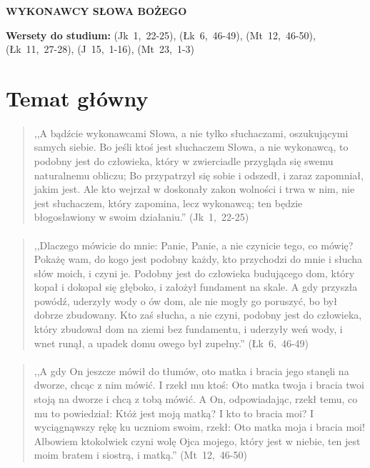 \documentclass[10pt,a4paper,oneside]{article}
\begin{document}
\centerline{\textbf{\MakeUppercase{Wykonawcy Słowa Bożego}}}
\begin{center}
\textbf{Wersety do studium:} \mbox{(Jk 1, 22-25)}, \mbox{(Łk 6, 46-49)}, \mbox{(Mt 12, 46-50)}, \mbox{(Łk 11, 27-28)}, \mbox{(J 15, 1-16)}, \mbox{(Mt 23, 1-3)}
\end{center}
\section{Temat główny}
\paragraph{}
\begin{quote}
,,A bądźcie wykonawcami Słowa, a nie tylko słuchaczami, oszukującymi samych siebie. Bo jeśli ktoś jest słuchaczem Słowa, a nie wykonawcą, to podobny jest do człowieka, który w zwierciadle przygląda się swemu naturalnemu obliczu; Bo przypatrzył się sobie i odszedł, i zaraz zapomniał, jakim jest. Ale kto wejrzał w doskonały zakon wolności i trwa w nim, nie jest słuchaczem, który zapomina, lecz wykonawcą; ten będzie błogosławiony w swoim działaniu.'' \mbox{(Jk 1, 22-25)}
\end{quote}
\paragraph{}
\begin{quote}
,,Dlaczego mówicie do mnie: Panie, Panie, a nie czynicie tego, co mówię? Pokażę wam, do kogo jest podobny każdy, kto przychodzi do mnie i słucha słów moich, i czyni je. Podobny jest do człowieka budującego dom, który kopał i dokopał się głęboko, i założył fundament na skale. A gdy przyszła powódź, uderzyły wody o ów dom, ale nie mogły go poruszyć, bo był dobrze zbudowany. Kto zaś słucha, a nie czyni, podobny jest do człowieka, który zbudował dom na ziemi bez fundamentu, i uderzyły weń wody, i wnet runął, a upadek domu owego był zupełny.'' \mbox{(Łk 6, 46-49)}
\end{quote}
\paragraph{}
\begin{quote}
,,A gdy On jeszcze mówił do tłumów, oto matka i bracia jego stanęli na dworze, chcąc z nim mówić. I rzekł mu ktoś: Oto matka twoja i bracia twoi stoją na dworze i chcą z tobą mówić. A On, odpowiadając, rzekł temu, co mu to powiedział: Któż jest moją matką? I kto to bracia moi? I wyciągnąwszy rękę ku uczniom swoim, rzekł: Oto matka moja i bracia moi! Albowiem ktokolwiek czyni wolę Ojca mojego, który jest w niebie, ten jest moim bratem i siostrą, i matką.'' \mbox{(Mt 12, 46-50)}
\end{quote}
\end{document}
